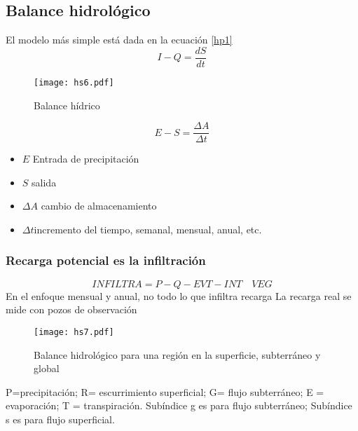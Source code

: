 \subsection{Balance hidrológico}
El modelo más simple está dada en la ecuación \eqref{hp1}
\begin{equation}
    I - Q = \frac{dS}{dt}
\end{equation}
\begin{figure}[h!]
\centering
  \texttt{[image: hs6.pdf]}
  \caption{Balance hídrico}
  \label{hs6}
\end{figure}
\begin{equation}
    E - S =\frac{\Delta A}{\Delta t}
\end{equation}
\begin{notation}
    \begin{itemize}
        \item $E$ Entrada de precipitación
        \item $S$ salida
        \item $\Delta A$ cambio de almacenamiento
        \item $\Delta t$incremento del tiempo, semanal, mensual, anual, etc.\cite{viessman1977hydrologic}
    \end{itemize}
\end{notation}
\subsubsection{Recarga potencial es la infiltración}
\begin{equation}
    INFILTRA= P-Q-EVT-INT\quad VEG
\end{equation}
En el enfoque mensual y anual, no todo lo que infiltra recarga
La recarga real se mide con pozos de observación
\begin{figure}[h!]
\centering
  \texttt{[image: hs7.pdf]}
  \caption{Balance hidrológico para una región en la superficie, subterráneo y global}
  \label{hs7}
\end{figure}
\begin{notation}
    P=precipitación; R= escurrimiento superficial; G= flujo
subterráneo; E = evaporación; T = transpiración. Subíndice g es
para flujo subterráneo; Subíndice s es para flujo superficial.
\end{notation}

